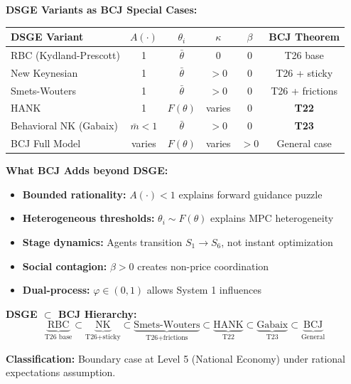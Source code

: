 \begin{tcolorbox}[colback=gray!10!white, colframe=gray!75!black,
    title=Theorem BCJ-T26: DSGE as Boundary Case]
\textbf{DSGE Variants as BCJ Special Cases:}
\begin{center}
\begin{tabular}{lccccc}
\toprule
\textbf{DSGE Variant} & $A(\cdot)$ & $\theta_i$ & $\kappa$ & $\beta$ & \textbf{BCJ Theorem} \\
\midrule
RBC (Kydland-Prescott) & 1 & $\bar{\theta}$ & 0 & 0 & T26 base \\
New Keynesian & 1 & $\bar{\theta}$ & $>0$ & 0 & T26 + sticky \\
Smets-Wouters & 1 & $\bar{\theta}$ & $>0$ & 0 & T26 + frictions \\
HANK & 1 & $F(\theta)$ & varies & 0 & \textbf{T22} \\
Behavioral NK (Gabaix) & $\bar{m}<1$ & $\bar{\theta}$ & $>0$ & 0 & \textbf{T23} \\
BCJ Full Model & varies & $F(\theta)$ & varies & $>0$ & General case \\
\bottomrule
\end{tabular}
\end{center}

\textbf{What BCJ Adds beyond DSGE:}
\begin{itemize}[nosep]
\item \textbf{Bounded rationality:} $A(\cdot) < 1$ explains forward guidance puzzle
\item \textbf{Heterogeneous thresholds:} $\theta_i \sim F(\theta)$ explains MPC heterogeneity
\item \textbf{Stage dynamics:} Agents transition $S_1 \to S_6$, not instant optimization
\item \textbf{Social contagion:} $\beta > 0$ creates non-price coordination
\item \textbf{Dual-process:} $\varphi \in (0,1)$ allows System 1 influences
\end{itemize}

\textbf{DSGE $\subset$ BCJ Hierarchy:}
\begin{equation}
\underbrace{\text{RBC}}_{\text{T26 base}} \subset \underbrace{\text{NK}}_{\text{T26+sticky}} \subset \underbrace{\text{Smets-Wouters}}_{\text{T26+frictions}} \subset \underbrace{\text{HANK}}_{\text{T22}} \subset \underbrace{\text{Gabaix}}_{\text{T23}} \subset \underbrace{\text{BCJ}}_{\text{General}}
\end{equation}

\textbf{Classification:} Boundary case at Level 5 (National Economy) under rational expectations assumption.
\end{tcolorbox}

